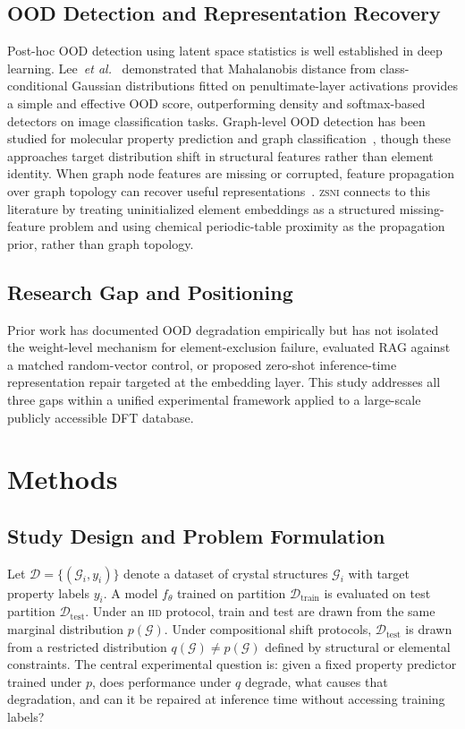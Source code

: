 \documentclass[final,5p,twocolumn,10pt]{elsarticle}
\newcommand{\iid}{\textsc{iid}}
\newcommand{\zsni}{\textsc{zsni}}
\newcommand{\etal}{\textit{et al.}}
\begin{document}
\subsection{OOD Detection and Representation Recovery}

Post-hoc OOD detection using latent space statistics is well established
in deep learning. Lee~\etal{}~\cite{lee2018simple} demonstrated that
Mahalanobis distance from class-conditional Gaussian distributions fitted
on penultimate-layer activations provides a simple and effective OOD
score, outperforming density and softmax-based detectors on image
classification tasks. Graph-level OOD detection has been studied for
molecular property prediction and graph classification~\cite{liu2023good,
wu2023data}, though these approaches target distribution shift in structural
features rather than element identity. When graph node features are
missing or corrupted, feature propagation over graph topology can recover
useful representations~\cite{rossi2021unreasonable}. \zsni{} connects to this
literature by treating uninitialized element embeddings as a structured
missing-feature problem and using chemical periodic-table proximity as the
propagation prior, rather than graph topology.

\subsection{Research Gap and Positioning}

Prior work has documented OOD degradation empirically but has not isolated
the weight-level mechanism for element-exclusion failure, evaluated RAG
against a matched random-vector control, or proposed zero-shot
inference-time representation repair targeted at the embedding layer. This study addresses
all three gaps within a unified experimental framework applied to a
large-scale publicly accessible DFT database.
\section{Methods}
\label{sec:methods}

\subsection{Study Design and Problem Formulation}

Let $\mathcal{D} = \{(\mathcal{G}_i, y_i)\}$ denote a dataset of crystal
structures $\mathcal{G}_i$ with target property labels $y_i$. A model
$f_\theta$ trained on partition $\mathcal{D}_{\text{train}}$ is evaluated
on test partition $\mathcal{D}_{\text{test}}$. Under an \iid{} protocol,
train and test are drawn from the same marginal distribution $p(\mathcal{G})$.
Under compositional shift protocols, $\mathcal{D}_{\text{test}}$ is drawn
from a restricted distribution $q(\mathcal{G}) \neq p(\mathcal{G})$
defined by structural or elemental constraints. The central experimental
question is: given a fixed property predictor trained under $p$, does
performance under $q$ degrade, what causes that degradation, and can it
be repaired at inference time without accessing training labels?
\end{document}
